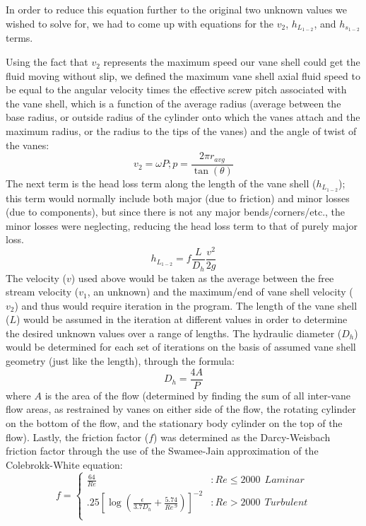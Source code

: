 \documentclass{report}
\begin{document}
In order to reduce this equation further to the original two unknown values we wished to solve for, we had to come up with equations for the $v_2$, $h_{L_{1-2}}$, and $h_{s_{1-2}}$ terms.\par
Using the fact that $v_2$ represents the maximum speed our vane shell could get the fluid moving without slip, we defined the maximum vane shell axial fluid speed to be equal to the angular velocity times the effective screw pitch associated with the vane shell, which is a function of the average radius (average between the base radius, or outside radius of the cylinder onto which the vanes attach and the maximum radius, or the radius to the tips of the vanes) and the angle of twist of the vanes:
\begin{equation}
v_2=\omega P;p=\frac{2\pi r_{avg}}{\tan(\theta)}
\end{equation}
The next term is the head loss term along the length of the vane shell ($h_{L_{1-2}}$); this term would normally include both major (due to friction) and minor losses (due to components), but since there is not any major bends/corners/etc., the minor losses were neglecting, reducing the head loss term to that of purely major loss.
\begin{equation}
h_{L_{1-2}}=f\frac{L}{D_h}\frac{v^2}{2g}
\end{equation}
The velocity ($v$) used above would be taken as the average between the free stream velocity ($v_1$, an unknown) and the maximum/end of vane shell velocity ($v_2$) and thus would require iteration in the program.  The length of the vane shell ($L$) would be assumed in the iteration at different values in order to determine the desired unknown values over a range of lengths.  The hydraulic diameter ($D_h$) would be determined for each set of iterations on the basis of assumed vane shell geometry (just like the length), through the formula:
\begin{equation}
D_h=\frac{4A}{P}
\end{equation}
where $A$ is the area of the flow (determined by finding the sum of all inter-vane flow areas, as restrained by vanes on either side of the flow, the rotating cylinder on the bottom of the flow, and the stationary body cylinder on the top of the flow).  Lastly, the friction factor ($f$) was determined as the Darcy-Weisbach friction factor through the use of the Swamee-Jain approximation of the Colebrokk-White equation:
\begin{equation}
f=\left\{\begin{array}{ll}
\frac{64}{Re}&:Re\leq2000~~Laminar\\
.25[\log(\frac{\epsilon}{3.7D_h}+\frac{5.74}{Re^{.9}})]^{-2} &:Re>2000~~Turbulent\\
\end{array}
\right.
\end{equation}
\end{document}
